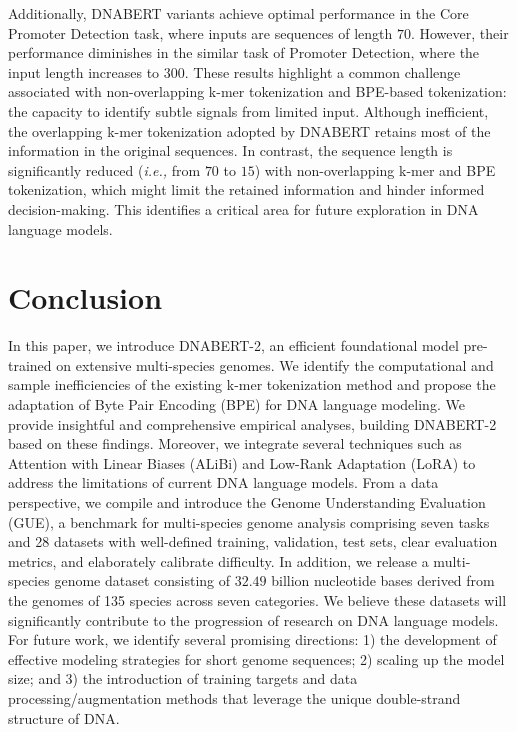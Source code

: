 \documentclass{article}
\begin{document}
Additionally, DNABERT variants achieve optimal performance in the Core Promoter Detection task, where inputs are sequences of length $70$. However, their performance diminishes in the similar task of Promoter Detection, where the input length increases to $300$. These results highlight a common challenge associated with non-overlapping k-mer tokenization and BPE-based tokenization: the capacity to identify subtle signals from limited input. Although inefficient, the overlapping k-mer tokenization adopted by DNABERT retains most of the information in the original sequences. In contrast, the sequence length is significantly reduced (\textit{i.e.,} from $70$ to $15$) with non-overlapping k-mer and BPE tokenization, which might limit the retained information and hinder informed decision-making. This identifies a critical area for future exploration in DNA language models.














\section{Conclusion}
In this paper, we introduce DNABERT-2, an efficient foundational model pre-trained on extensive multi-species genomes. We identify the computational and sample inefficiencies of the existing k-mer tokenization method and propose the adaptation of Byte Pair Encoding (BPE) for DNA language modeling. We provide insightful and comprehensive empirical analyses, building DNABERT-2 based on these findings. Moreover, we integrate several techniques such as Attention with Linear Biases (ALiBi) and Low-Rank Adaptation (LoRA) to address the limitations of current DNA language models.
From a data perspective, we compile and introduce the Genome Understanding Evaluation (GUE), a benchmark for multi-species genome analysis comprising seven tasks and 28 datasets with well-defined training, validation, test sets, clear evaluation metrics, and elaborately calibrate difficulty. In addition, we release a multi-species genome dataset consisting of $32.49$ billion nucleotide bases derived from the genomes of 135 species across seven categories. We believe these datasets will significantly contribute to the progression of research on DNA language models.
For future work, we identify several promising directions: 1) the development of effective modeling strategies for short genome sequences; 2) scaling up the model size; and 3) the introduction of training targets and data processing/augmentation methods that leverage the unique double-strand structure of DNA.
\end{document}
